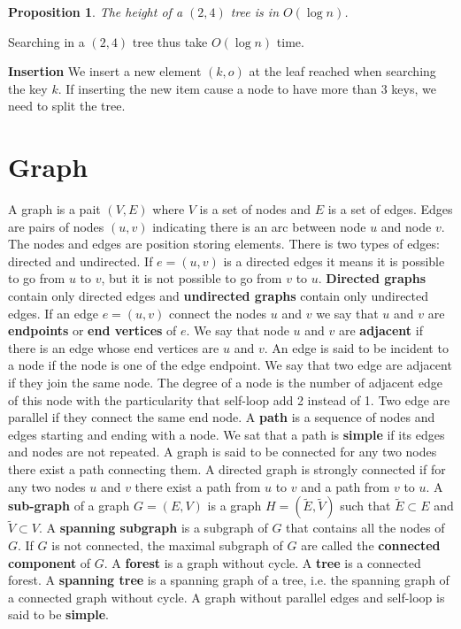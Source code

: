 \documentclass[10pt]{article}
\newtheorem{prop}{Proposition}
\begin{document}
\begin{prop}
	The height of a $(2, 4)$ tree is in $O(\log n)$.
\end{prop}

Searching in a $(2,4)$ tree thus take $O(\log n)$ time. 

\textbf{Insertion} We insert a new element $(k, o)$ at the leaf reached when searching the key $k$. If inserting the new item cause a node to have more than 3 keys, we need to split the tree. 

\section{Graph}
A graph is a pait $(V, E)$ where $V$ is a set of nodes and $E$ is a set of edges. Edges are pairs of nodes $(u, v)$ indicating there is an arc between node $u$ and node $v$. The nodes and edges are position storing elements. There is two types of edges: directed and undirected. If $e=(u, v)$ is a directed edges it means it is possible to go from $u$ to $v$, but it is not possible to go from $v$ to $u$. \textbf{Directed graphs} contain only directed edges and \textbf{undirected graphs} contain only undirected edges. If an edge $e=(u, v)$ connect the nodes $u$ and $v$ we say that $u$ and $v$ are \textbf{endpoints} or \textbf{end vertices} of $e$. We say that node $u$ and $v$ are \textbf{adjacent} if there is an edge whose end vertices are $u$ and $v$. An edge is said to be incident to a node if the node is one of the edge endpoint. We say that two edge are adjacent if they join the same node. The degree of a node is the number of adjacent edge of this node with the particularity that self-loop add 2 instead of 1. Two edge are parallel if they connect the same end node. A \textbf{path} is a sequence of nodes and edges starting and ending with a node. We sat that a path is \textbf{simple} if its edges and nodes are not repeated. A graph is said to be connected for any two nodes there exist a path connecting them. A directed graph is strongly connected if for any two nodes $u$ and $v$ there exist a path from $u$ to $v$ and a path from $v$ to $u$. A \textbf{sub-graph} of a graph $G=(E, V)$ is a graph $H=(\tilde{E}, \tilde{V})$ such that $\tilde{E} \subset E$ and $\tilde{V} \subset V$. A \textbf{spanning subgraph} is a subgraph of $G$ that contains all the nodes of $G$. If $G$ is not connected, the maximal subgraph of $G$ are called the \textbf{connected component} of $G$. A \textbf{forest} is a graph without cycle. A \textbf{tree} is a connected forest. A \textbf{spanning tree} is a spanning graph of a tree, i.e. the spanning graph of a connected graph without cycle. A graph without parallel edges and self-loop is said to be \textbf{simple}.
\end{document}
